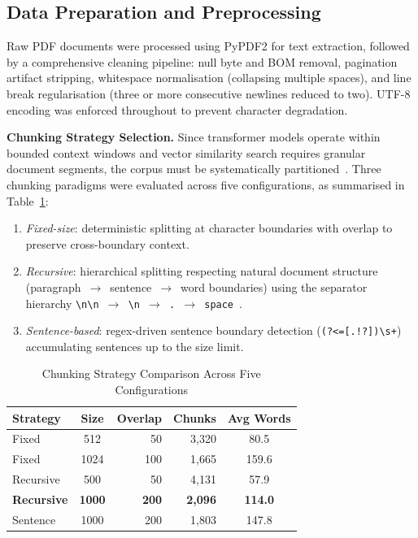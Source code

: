 \documentclass[conference]{IEEEtran}
\begin{document}
\subsection{Data Preparation and Preprocessing}

Raw PDF documents were processed using PyPDF2 for text extraction, followed by a comprehensive cleaning pipeline: null byte and BOM removal, pagination artifact stripping, whitespace normalisation (collapsing multiple spaces), and line break regularisation (three or more consecutive newlines reduced to two). UTF-8 encoding was enforced throughout to prevent character degradation.

\textbf{Chunking Strategy Selection.} Since transformer models operate within bounded context windows and vector similarity search requires granular document segments, the corpus must be systematically partitioned~\cite{gao2023retrieval}. Three chunking paradigms were evaluated across five configurations, as summarised in Table~\ref{tab:chunking}:

\begin{enumerate}[noitemsep]
    \item \textit{Fixed-size}: deterministic splitting at character boundaries with overlap to preserve cross-boundary context.
    \item \textit{Recursive}: hierarchical splitting respecting natural document structure (paragraph~$\rightarrow$~sentence~$\rightarrow$~word boundaries) using the separator hierarchy \texttt{\textbackslash n\textbackslash n~$\rightarrow$~\textbackslash n~$\rightarrow$~.~$\rightarrow$~space}~\cite{gao2023retrieval}.
    \item \textit{Sentence-based}: regex-driven sentence boundary detection (\texttt{(?<=[.!?])\textbackslash s+}) accumulating sentences up to the size limit.
\end{enumerate}

\begin{table}[htbp]
\caption{Chunking Strategy Comparison Across Five Configurations}
\label{tab:chunking}
\centering
\begin{tabular}{@{}lcrrc@{}}
\toprule
\textbf{Strategy} & \textbf{Size} & \textbf{Overlap} & \textbf{Chunks} & \textbf{Avg Words} \\
\midrule
Fixed & 512 & 50 & 3,320 & 80.5 \\
Fixed & 1024 & 100 & 1,665 & 159.6 \\
Recursive & 500 & 50 & 4,131 & 57.9 \\
\textbf{Recursive} & \textbf{1000} & \textbf{200} & \textbf{2,096} & \textbf{114.0} \\
Sentence & 1000 & 200 & 1,803 & 147.8 \\
\bottomrule
\end{tabular}
\end{table}
\end{document}
